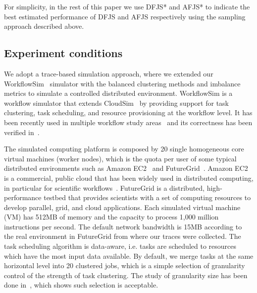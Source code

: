 For simplicity, in the rest of this paper we use DFJS* and AFJS* to indicate the best estimated performance of DFJS and AFJS respectively using the sampling approach described above.


\subsection{Experiment conditions}
\label{sec:experiment_conditions}
We adopt a trace-based simulation approach, where we extended our WorkflowSim~\cite{Chen2012a} simulator with the balanced clustering methods and imbalance metrics to simulate a controlled distributed environment. WorkflowSim is a workflow simulator that extends CloudSim~\cite{Calheiros2011} by providing support for task clustering, task scheduling, and resource provisioning at the workflow level. It has been recently used in multiple workflow study areas~\cite{6683907,Chen2012, jrad2013broker} and its correctness has been verified in~\cite{Chen2012a}. 

The simulated computing platform is composed by 20 single homogeneous core virtual machines (worker nodes), which is the quota per user of some typical distributed environments such as Amazon EC2~\cite{AmazonAWS} and FutureGrid~\cite{FutureGrid}. Amazon EC2 is a commercial, public cloud that has been widely used in distributed computing, in particular for scientific workflows~\cite{Juve09scientificworkflow}. FutureGrid is a distributed, high-performance testbed that provides scientists with a set of computing resources to develop parallel, grid, and cloud applications. Each simulated virtual machine (VM) has 512MB of memory and the capacity to process 1,000 million instructions per second. The default network bandwidth is 15MB according to the real environment in FutureGrid from where our traces were collected. The task scheduling algorithm is data-aware, i.e. tasks are scheduled to resources which have the most input data available. By default, we merge tasks at the same horizontal level into 20 clustered jobs, which is a simple selection of granularity control of the strength of task clustering. The study of granularity size has been done in~\cite{6683907}, which shows such selection is acceptable. 


